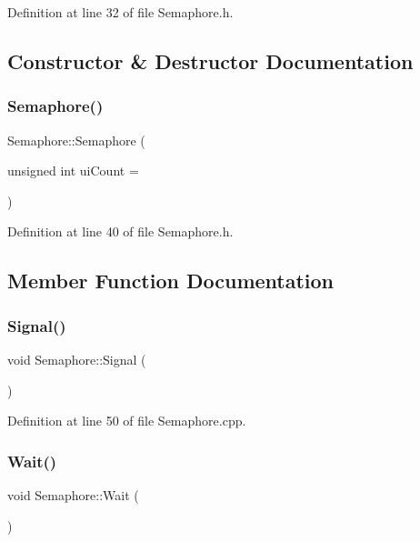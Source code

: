 Definition at line 32 of file Semaphore.\+h.



\subsection{Constructor \& Destructor Documentation}
\mbox{\label{class_semaphore_a0d9290d316636875ca85d1d78950a817}} 
\subsubsection{\texorpdfstring{Semaphore()}{Semaphore()}}
{\footnotesize\ttfamily Semaphore\+::\+Semaphore (\begin{DoxyParamCaption}\item[{unsigned int}]{ui\+Count = {} }\end{DoxyParamCaption})\hspace{0.3cm}{\ttfamily [inline]}}



Definition at line 40 of file Semaphore.\+h.



\subsection{Member Function Documentation}
\mbox{\label{class_semaphore_a86f92f738b4486439b296d8e235895f2}} 
\subsubsection{\texorpdfstring{Signal()}{Signal()}}
{\footnotesize\ttfamily void Semaphore\+::\+Signal (\begin{DoxyParamCaption}{ }\end{DoxyParamCaption})}



Definition at line 50 of file Semaphore.\+cpp.

\mbox{\label{class_semaphore_a72aabebf026e3a8b1f3e4d0fa8ee1eda}} 
\subsubsection{\texorpdfstring{Wait()}{Wait()}\hspace{0.1cm}{\footnotesize\ttfamily [1/2]}}
{\footnotesize\ttfamily void Semaphore\+::\+Wait (\begin{DoxyParamCaption}{ }\end{DoxyParamCaption})}



